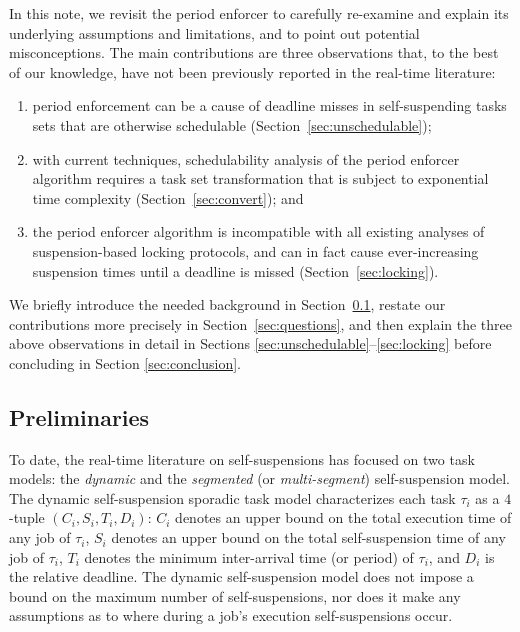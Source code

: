 In this note, we revisit the period enforcer \cite{Raj:suspension1991} to carefully re-examine and explain its underlying assumptions and limitations, and to point out potential misconceptions.  The main contributions are three observations that, to the best of our knowledge, have not been previously reported in the real-time literature:
\begin{enumerate}
	\item period enforcement can be a cause of deadline misses in self-suspending tasks sets that are otherwise schedulable (Section~\ref{sec:unschedulable}); 
	\item with current techniques, schedulability analysis of the period enforcer algorithm requires a task set transformation that is subject to exponential time complexity (Section~\ref{sec:convert}); and
	\item the period enforcer algorithm is incompatible with all existing analyses of suspension-based locking protocols, and can in fact cause ever-increasing suspension times until a deadline is missed (Section~\ref{sec:locking}).
\end{enumerate}


We briefly introduce the needed background in Section~\ref{sec:prelim}, restate our contributions more precisely in Section~\ref{sec:questions}, and then explain the three above  observations in detail in Sections \ref{sec:unschedulable}--\ref{sec:locking} before concluding in Section \ref{sec:conclusion}.

\subsection{Preliminaries}
\label{sec:prelim}

To date, the real-time literature on self-suspensions has focused on two task models: the \emph{dynamic} and the \emph{segmented} (or \emph{multi-segment}) self-suspension model. 
The dynamic self-suspension sporadic task model characterizes each
task $\tau_i$ as a $4$-tuple $(C_i,S_i,T_i,D_i)$: 
$C_i$ denotes an upper bound on the total execution time of any job of $\tau_i$,
$S_i$ denotes an upper bound on the total self-suspension time of any job of $\tau_i$,
$T_i$ denotes the minimum inter-arrival time (or period) of $\tau_i$, and $D_i$ is the relative deadline. The dynamic self-suspension model does not impose a bound on the maximum number of self-suspensions, nor does it make any assumptions as to where during a job's execution self-suspensions occur.

